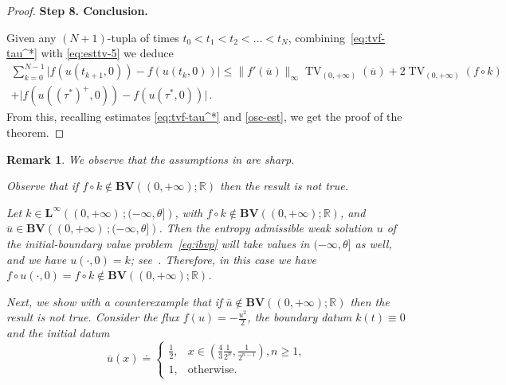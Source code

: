 \documentclass[a4paper, 10pt, final]{article}
\newtheorem{remark}{Remark}[section]
\newcommand{\R}{\mathbb{R}} \newcommand{\N}{\mathbb{N}}
\DeclareMathOperator{\tv}{TV}
\begin{document}
\begin{proof}
  \noindent
  {\bf Step 8. Conclusion.}

  Given any $(N+1)$-tupla of times $t_0< t_1<t_2<\dots< t_{N}$,
  combining~\eqref{eq:tvf-tau^*} with \eqref{eq:esttv-5}
  we deduce
  \begin{align*}
      \sum_{k=0}^{N-1}
      \big|f(u(t_{k+1},0))-f(u(t_k,0))\big|
      \leq \|f'(\overline u)\|_\infty \tv_{(0, +\infty)} (\overline{u}) +2\tv_{(0, +\infty)} (f\circ k)\\+\big|f(u((\tau^*)^+,0))-f(u(\tau^*,0))\big|\,.
  \end{align*}
  From this, recalling estimates \eqref{eq:tvf-tau^*} and  \eqref{osc-est},  we get  the proof of the theorem. 
\end{proof}

\begin{remark}\upshape
  \label{sharphyp-bv-fluxtrace}
  We observe that the assumptions in  are sharp.

  Observe that if   $f\circ k\not\in \mathbf{BV}((0, +\infty); \R)$  then the result is not true. 
  
  Let 
  $k \in \mathbf{L^\infty}\left((0,+\infty)\,; (-\infty,\theta]\right)$, with
  $f\circ k\not\in \mathbf{BV} ((0,+\infty); \R)$,
  and $\overline u \in \mathbf{BV}\left((0,+\infty)\,; (-\infty,\theta]\right)$.
  Then the 
  entropy   admissible  weak solution  $u$ of the initial-boundary value problem~\eqref{eq:ibvp}
  will take values in $(-\infty,\theta]$
  as well, and we have
  $u(\cdot , 0)=k$; see~\cite{lf}.
  Therefore, in this case we have $f\circ u(\cdot, 0)=f\circ k\not\in \mathbf{BV} ((0,+\infty); \R)$.

  Next, we show with a counterexample that if $ \overline u\not\in \mathbf{BV}((0, +\infty); \R)$  
  then the result is not true. Consider the  flux $f(u)=-\frac{u^2}{2}$, the boundary datum $k(t)\equiv 0$ and 
  the  initial datum
  \begin{equation}
    \overline{u}(x)\doteq
    \begin{cases}
      \frac{1}{2}, & x\in \left(\frac{4}{3}
      \frac{1}{2^n}, \frac{1}{2^{n-1}}\right), 
      n\geq 1,\\
      1, &\text{otherwise}. 
    \end{cases}
  \end{equation}



\end{remark}
\end{document}
